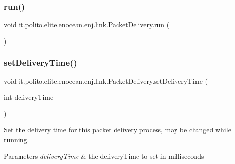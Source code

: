 \subsubsection{\texorpdfstring{run()}{run()}}
{\footnotesize\ttfamily void it.\+polito.\+elite.\+enocean.\+enj.\+link.\+Packet\+Delivery.\+run (\begin{DoxyParamCaption}{ }\end{DoxyParamCaption})}

\hypertarget{classit_1_1polito_1_1elite_1_1enocean_1_1enj_1_1link_1_1_packet_delivery_aa707d7801da7137ddfc2f40d588fbee8}{}\label{classit_1_1polito_1_1elite_1_1enocean_1_1enj_1_1link_1_1_packet_delivery_aa707d7801da7137ddfc2f40d588fbee8} 
\subsubsection{\texorpdfstring{set\+Delivery\+Time()}{setDeliveryTime()}}
{\footnotesize\ttfamily void it.\+polito.\+elite.\+enocean.\+enj.\+link.\+Packet\+Delivery.\+set\+Delivery\+Time (\begin{DoxyParamCaption}\item[{int}]{delivery\+Time }\end{DoxyParamCaption})}

Set the delivery time for this packet delivery process, may be changed while running.


\begin{DoxyParams}{Parameters}
{\em delivery\+Time} & the delivery\+Time to set in milliseconds \\
\hline
\end{DoxyParams}
\hypertarget{classit_1_1polito_1_1elite_1_1enocean_1_1enj_1_1link_1_1_packet_delivery_abefdd50b0c4a4287620aa80f75ee9dee}{}\label{classit_1_1polito_1_1elite_1_1enocean_1_1enj_1_1link_1_1_packet_delivery_abefdd50b0c4a4287620aa80f75ee9dee} 
